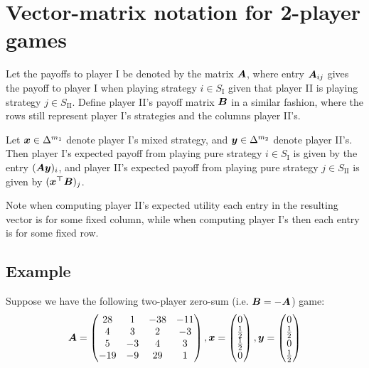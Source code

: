 \section{Vector-matrix notation for 2-player games}
	Let the payoffs to player I be denoted by the matrix $\bm{A}$, where
	entry $\bm{A}_{ij}$ gives the payoff to player I when playing strategy $i
	\in S_\text{I}$ given that player II is playing strategy $j \in
	S_\text{II}$. Define player II's payoff matrix $\bm{B}$ in a similar
	fashion, where the rows still represent player I's strategies and the
	columns player II's.

	Let $\bm{x} \in \Delta^{m_1}$ denote player I's mixed strategy, and
	$\bm{y} \in \Delta^{m_2}$ denote player II's. Then player I's expected
	payoff from playing pure strategy $i \in S_\text{I}$ is given by the entry
	$(\bm{Ay})_i$, and player II's expected payoff from playing pure strategy
	$j \in S_\text{II}$ is given by $(\bm{x^\top B})_j$.

	Note when computing player II's expected utility each entry in the
	resulting vector is for some fixed column, while when computing player I's
	then each entry is for some fixed row.

	\subsection{Example}
		Suppose we have the following two-player zero-sum (i.e. $\bm{B} =
		-\bm{A}$) game:
		\begin{equation*}
			\bm{A} = 
			\begin{pmatrix}
				28 & 1 & -38 & -11 \\
				4 & 3 & 2 & -3 \\
				5 & -3 & 4 & 3 \\
				-19 & -9 & 29 & 1
			\end{pmatrix},
			\bm{x} =
			\begin{pmatrix}
				0 \\
				\frac{1}{2} \\
				\frac{1}{2} \\
				0
			\end{pmatrix},
			\bm{y} = 
			\begin{pmatrix}
				0 \\
				\frac{1}{2} \\
				0 \\
				\frac{1}{2}
			\end{pmatrix}
		\end{equation*}

